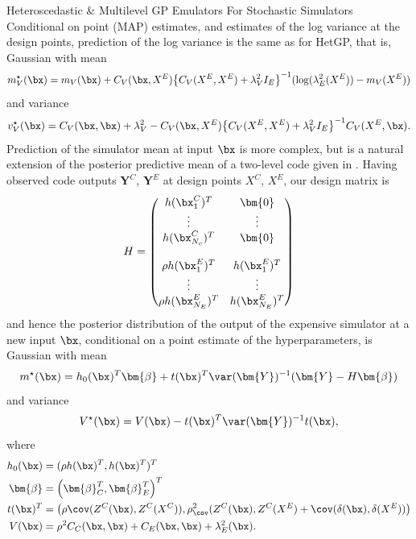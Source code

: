 \begin{chapter}{Heteroscedastic \& Multilevel GP Emulators For Stochastic Simulators\label{Ch:Hetsml}}
Conditional on point (MAP) estimates, and estimates of the log variance at the design points, prediction of the log variance is the same as for HetGP, that is, Gaussian with mean
\begin{equation*}
m^\star_V (\bx) = m_V(\bx) + C_V(\bx, X^E) \big\{ C_V(X^E, X^E) + \lambda_{V}^2 I_E \big\} ^{-1} (\log (\lambda^2_E(X^E)) - m_V(X^E) )\nonumber
\end{equation*}
and variance
\begin{equation*}
v^\star_V(\bx) = C_V(\bx, \bx) + \lambda^2_V - C_V(\bx, X^E) \big\{ C_V(X^E, X^E) + \lambda_{V}^2 I_E \big\} ^{-1} C_V(X^E, \bx).\nonumber
\end{equation*}
Prediction of the simulator mean at input $\bx$ is more complex, but is a natural extension of the posterior predictive mean of a two-level code given in \cite{Kennedy2000}. Having observed code outputs $\bm{Y}^C$, $\bm{Y}^E$ at design points $X^C$, $X^E$, our design matrix is
\begin{equation}
H = \begin{pmatrix}
h(\bx^C_1)^T & \bm{0} \\
\vdots & \vdots \\
h(\bx^C_{N_c})^T & \bm{0} \\
 & \\
\rho h(\bx^E_1)^T & h(\bx^E_1)^T \\
\vdots & \vdots \\
\rho h(\bx^E_{N_E})^T & h(\bx^E_{N_E})^T
\end{pmatrix}\nonumber
\end{equation}
and hence the posterior distribution of the output of the expensive simulator at a new input $\bx$, conditional on a point estimate of the hyperparameters, is Gaussian with mean
\begin{equation}
m^\star(\bx) = h_0(\bx)^T \bm{\beta} + t(\bx)^T \var(\bm{Y})^{-1}(\bm{Y} - H\bm{\beta})\nonumber
\end{equation}
 and variance
\begin{equation}
V^\star(\bx) = V(\bx) - t(\bx)^T \var(\bm{Y})^{-1} t(\bx),\nonumber
\end{equation}
where
\begin{align}
h_0(\bx) &= (\rho h(\bx)^T, h(\bx)^T)^T\nonumber \\
\bm{\beta} &= \left( \bm{\beta}_C ^T, \bm{\beta}_E ^T \right)^T\nonumber \\
t(\bx)^T &= \left( \rho \cov(Z^C(\bx), Z^C(X^C)), \rho^2_ \cov(Z^C(\bx), Z^C(X^E) + \cov(\delta(\bx), \delta(X^E)) \right) \nonumber\\
V(\bx) & = \rho^2 C_C(\bx, \bx) + C_E(\bx, \bx) + \lambda_E^2(\bx) .\nonumber
\end{align}


\end{chapter}
